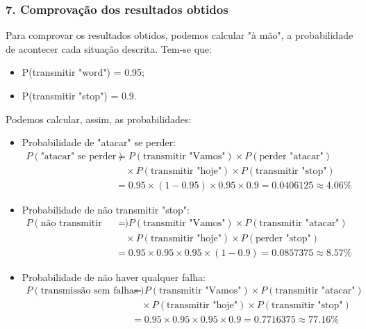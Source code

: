 \documentclass[11pt, a4paper, fleqn]{article}
\begin{document}
\subsubsection*{7. Comprovação dos resultados obtidos}

\noindent Para comprovar os resultados obtidos, podemos calcular "à mão", a probabilidade de acontecer cada situação descrita. Tem-se que:
\begin{itemize}
    \item P(transmitir "word") = 0.95;
    \item P(transmitir "stop") = 0.9.
\end{itemize}

\noindent Podemos calcular, assim, as probabilidades:
\begin{itemize}
    \item Probabilidade de "atacar" se perder:
    \begin{equation*}
    \begin{aligned}
    P(\text{"atacar" se perder})
    &= P(\text{transmitir "Vamos"})
        \times P(\text{perder "atacar"}) \\
    &\quad \times P(\text{transmitir "hoje"})
        \times P(\text{transmitir "stop"}) \\
    &= 0.95 \times (1 - 0.95) \times 0.95 \times 0.9
    = 0.0406125 \approx 4.06\%
    \end{aligned}
    \end{equation*}

    \item Probabilidade de não transmitir "stop":
    \begin{equation*}
    \begin{aligned}
    P(\text{não transmitir "stop"})
    &= P(\text{transmitir "Vamos"})
        \times P(\text{transmitir "atacar"}) \\
    &\quad \times P(\text{transmitir "hoje"})
        \times P(\text{perder "stop"}) \\
    &= 0.95 \times 0.95 \times 0.95 \times (1 - 0.9)
    = 0.0857375 \approx 8.57\%
    \end{aligned}
    \end{equation*}

    \item Probabilidade de não haver qualquer falha:
    \begin{equation*}
    \begin{aligned}
    P(\text{transmissão sem falhas})
    &= P(\text{transmitir "Vamos"})
        \times P(\text{transmitir "atacar"}) \\
    &\quad \times P(\text{transmitir "hoje"})
        \times P(\text{transmitir "stop"}) \\
    &= 0.95 \times 0.95 \times 0.95 \times 0.9
    = 0.7716375 \approx 77.16\%
    \end{aligned}
    \end{equation*}
\end{itemize}
\end{document}
